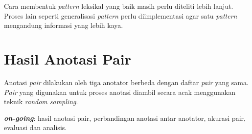 Cara membentuk \textit{pattern} leksikal yang baik masih perlu diteliti lebih lanjut. Proses lain seperti generalisasi \textit{pattern} perlu diimplementasi agar satu \textit{pattern} mengandung informasi yang lebih kaya.


\section{Hasil Anotasi Pair}
Anotasi \textit{pair} dilakukan oleh tiga anotator berbeda dengan daftar \textit{pair} yang sama. \textit{Pair} yang digunakan untuk proses anotasi diambil secara acak menggunakan teknik \textit{random sampling}.

\noindent \textbf{\textit{on-going}}: hasil anotasi pair, perbandingan anotasi antar anotator, akurasi pair, evaluasi dan analisis. 
